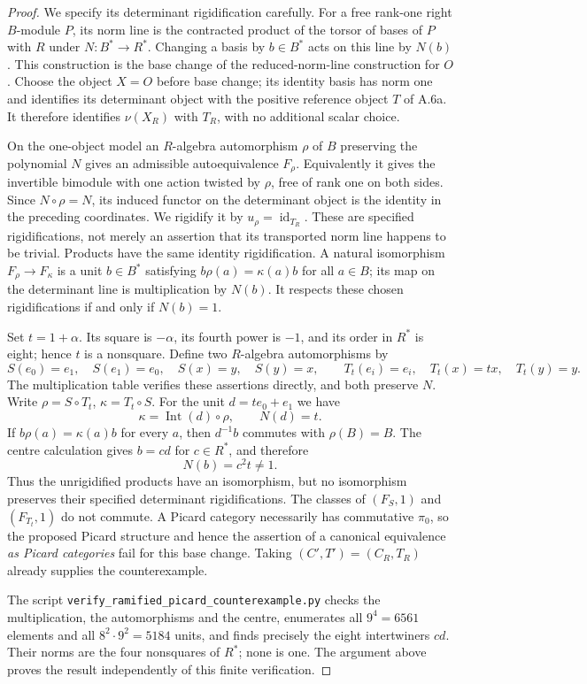 \begin{proof}
We specify its determinant rigidification carefully. For a free
rank-one right $B$-module $P$, its norm line is the contracted product
of the torsor of bases of $P$ with $R$ under $N:B^*\to R^*$.
Changing a basis by $b\in B^*$ acts on this line by $N(b)$.
This construction is the base change of the reduced-norm-line
construction for $O$. Choose the object $X=O$ before base change;
its identity basis has norm one and identifies its determinant object
with the positive reference object $T$ of A.6a. It therefore identifies
$\nu(X_R)$ with $T_R$, with no additional scalar choice.

On the one-object model an $R$-algebra automorphism $\rho$ of $B$
preserving the polynomial $N$ gives an admissible autoequivalence
$F_\rho$. Equivalently it gives the invertible bimodule with one
action twisted by $\rho$, free of rank one on both sides.
Since $N\circ\rho=N$, its induced functor on the determinant object
is the identity in the preceding coordinates. We rigidify it by
$u_\rho=\operatorname{id}_{T_R}$. These are specified rigidifications,
not merely an assertion that its transported norm line happens to
be trivial. Products have the same identity rigidification.
A natural isomorphism $F_\rho\to F_\kappa$ is a unit $b\in B^*$
satisfying $b\rho(a)=\kappa(a)b$ for all $a\in B$; its map on
the determinant line is multiplication by $N(b)$. It respects these
chosen rigidifications if and only if $N(b)=1$.

Set $t=1+\alpha$. Its square is $-\alpha$, its fourth power is $-1$,
and its order in $R^*$ is eight; hence $t$ is a nonsquare. Define
two $R$-algebra automorphisms by
\[
 S(e_0)=e_1,\quad S(e_1)=e_0,\quad S(x)=y,\quad S(y)=x,
 \qquad
 T_t(e_i)=e_i,\quad T_t(x)=tx,\quad T_t(y)=y.
\]
The multiplication table verifies these assertions directly, and
both preserve $N$. Write $\rho=S\circ T_t$, $\kappa=T_t\circ S$.
For the unit $d=te_0+e_1$ we have
\[
 \kappa=\operatorname{Int}(d)\circ\rho,\qquad N(d)=t.
\]
If $b\rho(a)=\kappa(a)b$ for every $a$, then $d^{-1}b$ commutes
with $\rho(B)=B$. The centre calculation gives $b=cd$ for
$c\in R^*$, and therefore
\[
 N(b)=c^2t\ne1.
\]
Thus the unrigidified products have an isomorphism, but no isomorphism
preserves their specified determinant rigidifications. The classes
of $(F_S,1)$ and $(F_{T_t},1)$ do not commute. A Picard category
necessarily has commutative $\pi_0$, so the proposed Picard structure
and hence the assertion of a canonical equivalence \emph{as Picard
categories} fail for this base change. Taking
$(C',T')=(C_R,T_R)$ already supplies the counterexample.

The script \texttt{verify\_ramified\_picard\_counterexample.py} checks
the multiplication, the automorphisms and the centre, enumerates all
$9^4=6561$ elements and all $8^2\cdot9^2=5184$ units, and finds
precisely the eight intertwiners $cd$. Their norms are the four
nonsquares of $R^*$; none is one. The argument above proves the result
independently of this finite verification.
\end{proof}

